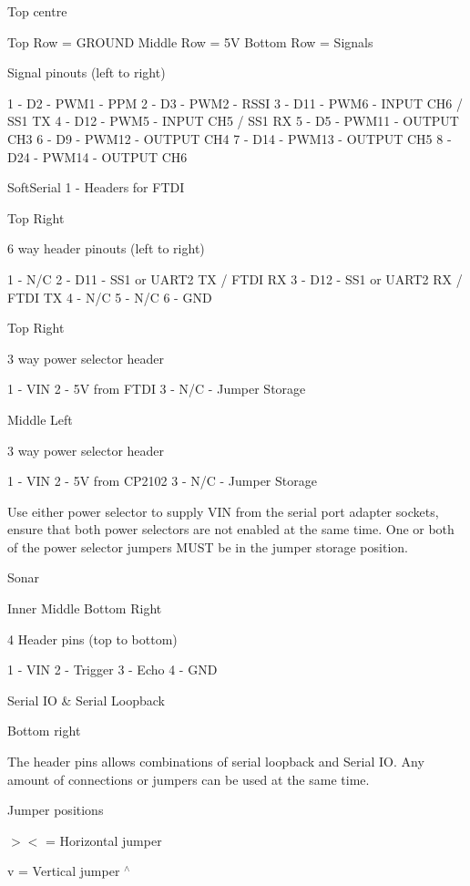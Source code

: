 Top centre

Top Row = G\+R\+O\+U\+N\+D Middle Row = 5\+V Bottom Row = Signals

Signal pinouts (left to right)

1 -\/ D2 -\/ P\+W\+M1 -\/ P\+P\+M 2 -\/ D3 -\/ P\+W\+M2 -\/ R\+S\+S\+I 3 -\/ D11 -\/ P\+W\+M6 -\/ I\+N\+P\+U\+T C\+H6 / S\+S1 T\+X 4 -\/ D12 -\/ P\+W\+M5 -\/ I\+N\+P\+U\+T C\+H5 / S\+S1 R\+X 5 -\/ D5 -\/ P\+W\+M11 -\/ O\+U\+T\+P\+U\+T C\+H3 6 -\/ D9 -\/ P\+W\+M12 -\/ O\+U\+T\+P\+U\+T C\+H4 7 -\/ D14 -\/ P\+W\+M13 -\/ O\+U\+T\+P\+U\+T C\+H5 8 -\/ D24 -\/ P\+W\+M14 -\/ O\+U\+T\+P\+U\+T C\+H6

Soft\+Serial 1 -\/ Headers for F\+T\+D\+I

Top Right

6 way header pinouts (left to right)

1 -\/ N/\+C 2 -\/ D11 -\/ S\+S1 or U\+A\+R\+T2 T\+X / F\+T\+D\+I R\+X 3 -\/ D12 -\/ S\+S1 or U\+A\+R\+T2 R\+X / F\+T\+D\+I T\+X 4 -\/ N/\+C 5 -\/ N/\+C 6 -\/ G\+N\+D

Top Right

3 way power selector header

1 -\/ V\+I\+N 2 -\/ 5\+V from F\+T\+D\+I 3 -\/ N/\+C -\/ Jumper Storage

Middle Left

3 way power selector header

1 -\/ V\+I\+N 2 -\/ 5\+V from C\+P2102 3 -\/ N/\+C -\/ Jumper Storage

Use either power selector to supply V\+I\+N from the serial port adapter sockets, ensure that both power selectors are not enabled at the same time. One or both of the power selector jumpers M\+U\+S\+T be in the jumper storage position.

Sonar

Inner Middle Bottom Right

4 Header pins (top to bottom)

1 -\/ V\+I\+N 2 -\/ Trigger 3 -\/ Echo 4 -\/ G\+N\+D

Serial I\+O \& Serial Loopback

Bottom right

The header pins allows combinations of serial loopback and Serial I\+O. Any amount of connections or jumpers can be used at the same time.

Jumper positions

$>$$<$ = Horizontal jumper

v = Vertical jumper $^\wedge$

